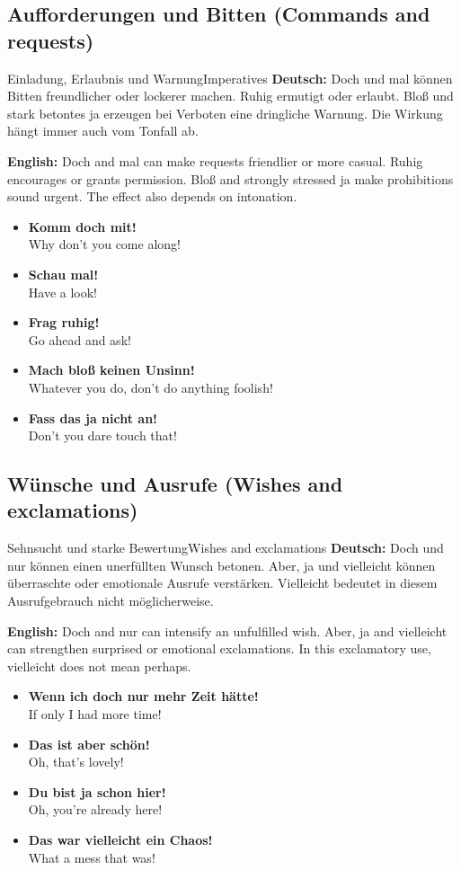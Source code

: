 \documentclass[a4paper,11pt]{article}
\newcommand{\GermanText}[1]{\textbf{Deutsch: }#1\par}
\newcommand{\EnglishText}[1]{{\small\color{SoftGray}\textbf{English: }#1\par}}
\newcommand{\ExampleItem}[2]{\item \textbf{#1}\\{\small\color{SoftGray}#2}}
\begin{document}
\subsection{Aufforderungen und Bitten \textnormal{(Commands and requests)}}
\begin{grammarentry}{Einladung, Erlaubnis und Warnung}{Imperatives}
\GermanText{Doch und mal können Bitten freundlicher oder lockerer machen. Ruhig ermutigt oder erlaubt. Bloß und stark betontes ja erzeugen bei Verboten eine dringliche Warnung. Die Wirkung hängt immer auch vom Tonfall ab.}
\EnglishText{Doch and mal can make requests friendlier or more casual. Ruhig encourages or grants permission. Bloß and strongly stressed ja make prohibitions sound urgent. The effect also depends on intonation.}
\end{grammarentry}
\begin{exbox}\begin{itemize}
\ExampleItem{Komm doch mit!}{Why don't you come along!}
\ExampleItem{Schau mal!}{Have a look!}
\ExampleItem{Frag ruhig!}{Go ahead and ask!}
\ExampleItem{Mach bloß keinen Unsinn!}{Whatever you do, don't do anything foolish!}
\ExampleItem{Fass das ja nicht an!}{Don't you dare touch that!}
\end{itemize}\end{exbox}
\subsection{Wünsche und Ausrufe \textnormal{(Wishes and exclamations)}}
\begin{grammarentry}{Sehnsucht und starke Bewertung}{Wishes and exclamations}
\GermanText{Doch und nur können einen unerfüllten Wunsch betonen. Aber, ja und vielleicht können überraschte oder emotionale Ausrufe verstärken. Vielleicht bedeutet in diesem Ausrufgebrauch nicht möglicherweise.}
\EnglishText{Doch and nur can intensify an unfulfilled wish. Aber, ja and vielleicht can strengthen surprised or emotional exclamations. In this exclamatory use, vielleicht does not mean perhaps.}
\end{grammarentry}
\begin{exbox}\begin{itemize}
\ExampleItem{Wenn ich doch nur mehr Zeit hätte!}{If only I had more time!}
\ExampleItem{Das ist aber schön!}{Oh, that's lovely!}
\ExampleItem{Du bist ja schon hier!}{Oh, you're already here!}
\ExampleItem{Das war vielleicht ein Chaos!}{What a mess that was!}
\end{itemize}\end{exbox}
\end{document}
